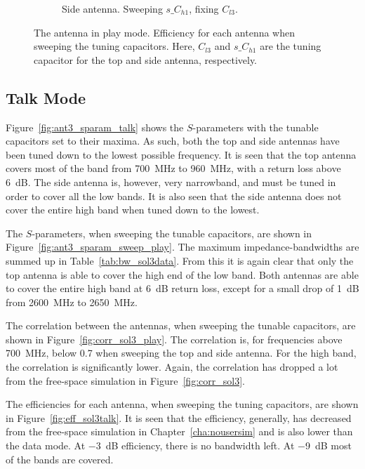 \begin{figure}[htbp]
\begin{subfigure}{0.49\linewidth}
        \caption{Side antenna. Sweeping $s\_C_{h1}$, fixing $C_{l3}$.}
    \end{subfigure}
    \caption{The antenna in play mode. Efficiency for each antenna when sweeping the tuning capacitors. Here, $C_{l3}$ and $s\_C_{h1}$ are the tuning capacitor for the top and side antenna, respectively.}
    \label{fig:eff_sol3play}
\end{figure}

\FloatBarrier
\subsection{Talk Mode}
Figure~\ref{fig:ant3_sparam_talk} shows the $S$-parameters with the tunable capacitors set to their maxima. As such, both the top and side antennas have been tuned down to the lowest possible frequency. It is seen that the top antenna covers most of the band from \SI{700}{MHz} to \SI{960}{MHz}, with a return loss above \SI{6}{dB}. The side antenna is, however, very narrowband, and must be tuned in order to cover all the low bands. It is also seen that the side antenna does not cover the entire high band when tuned down to the lowest. 

The $S$-parameters, when sweeping the tunable capacitors, are shown in Figure~\ref{fig:ant3_sparam_sweep_play}. The maximum impedance-bandwidths are summed up in Table~\ref{tab:bw_sol3data}. From this it is again clear that only the top antenna is able to cover the high end of the low band. Both antennas are able to cover the entire high band at \SI{6}{dB} return loss, except for a small drop of \SI{1}{dB} from \SI{2600}{MHz} to \SI{2650}{MHz}.

The correlation between the antennas, when sweeping the tunable capacitors, are shown in Figure~\ref{fig:corr_sol3_play}. The correlation is, for frequencies above \SI{700}{MHz}, below 0.7 when sweeping the top and side antenna. For the high band, the correlation is significantly lower. Again, the correlation has dropped a lot from the free-space simulation in Figure~\ref{fig:corr_sol3}.

The efficiencies for each antenna, when sweeping the tuning capacitors, are shown in Figure~\ref{fig:eff_sol3talk}. It is seen that the efficiency, generally, has decreased from the free-space simulation in Chapter~\ref{cha:nousersim} and is also lower than the data mode. At \SI{-3}{dB} efficiency, there is no bandwidth left. At \SI{-9}{dB} most of the bands are covered.

